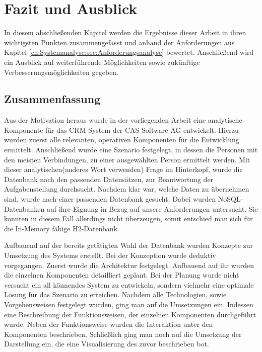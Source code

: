 
\chapter{Fazit und Ausblick}
\label{ch:Ergebnis}

In diesem abschließenden Kapitel werden die Ergebnisse dieser Arbeit in ihren wichtigsten Punkten zusammengefasst und anhand der Anforderungen aus Kapitel \ref{ch:Systemanalyse:sec:Anforderungsanalyse} bewertet. Anschließend wird ein Ausblick auf weiterführende Möglichkeiten sowie zukünftige Verbesserungsmöglichkeiten gegeben. 

\section{Zusammenfassung}
\label{ch:Ergebnis:sec:zusammenfassung}

Aus der Motivation heraus wurde in der vorliegenden Arbeit eine analytische Komponente für das CRM-System der CAS Software AG entwickelt. Hierzu wurden zuerst alle relevanten, operativen Komponenten für die Entwicklung ermittelt. Anschließend wurde eine Szenario festgelegt, in dessen die Personen mit den meisten Verbindungen, zu einer ausgewählten Person ermittelt werden. Mit dieser analytischen(anderes Wort verwenden) Frage im Hinterkopf, wurde die Datenbank nach den passenden Datensätzen, zur Beantwortung der Aufgabenstellung durchsucht. Nachdem klar war, welche Daten zu übernehmen sind, wurde nach einer passenden Datenbank gesucht. Dabei wurden NoSQL-Datenbanken auf ihre Eignung in Bezug auf unsere Anforderungen untersucht. Sie konnten in diesem Fall allerdings nicht überzeugen, somit entschied man sich für die In-Memory fähige H2-Datenbank.   

Aufbauend auf der bereits getätigten Wahl der Datenbank wurden Konzepte zur Umsetzung des Systems  erstellt. Bei der Konzeption wurde deduktiv vorgegangen. Zuerst wurde die Architektur festgelegt. Aufbauend auf ihr wurden die einzelnen Komponenten detailliert geplant. Bei der Planung wurde nicht versucht ein all könnendes System zu entwickeln, sondern vielmehr eine optimale Lösung für das Szenario zu erreichen. Nachdem alle Technologien, sowie Vorgehensweisen festgelegt wurden, ging man auf die Umsetzungen ein. Indessen eine Beschreibung der Funktionsweisen, der einzelnen Komponenten durchgeführt wurde. Neben der Funktionsweise wurden die Interaktion unter den Komponenten beschrieben. Schließlich ging man noch auf die Umsetzung der Darstellung ein, die eine Visualisierung des zuvor beschrieben bot. 
 
